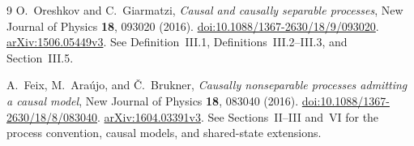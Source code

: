 \documentclass[11pt,letterpaper]{article}
\theoremstyle{remark}\newtheorem{remark}[theorem]{Remark}
\begin{document}
\begin{thebibliography}{9}
O.~Oreshkov and C.~Giarmatzi,
\emph{Causal and causally separable processes},
New Journal of Physics \textbf{18}, 093020 (2016).
\href{https://doi.org/10.1088/1367-2630/18/9/093020}{doi:10.1088/1367-2630/18/9/093020}.
\href{https://arxiv.org/abs/1506.05449v3}{\mbox{arXiv:1506.05449v3}}.
See Definition~III.1, Definitions~III.2--III.3, and Section~III.5.

A.~Feix, M.~Ara\'ujo, and \v{C}.~Brukner,
\emph{Causally nonseparable processes admitting a causal model},
New Journal of Physics \textbf{18}, 083040 (2016).
\href{https://doi.org/10.1088/1367-2630/18/8/083040}{doi:10.1088/1367-2630/18/8/083040}.
\href{https://arxiv.org/abs/1604.03391v3}{\mbox{arXiv:1604.03391v3}}.
See Sections~II--III and~VI for the process convention, causal models, and shared-state extensions.
\end{thebibliography}
\end{document}
